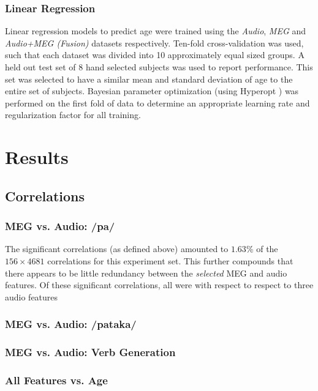 \documentclass[a4paper]{article}
\begin{document}
\subsubsection{Linear Regression}

Linear regression models to predict age were trained using the \textit{Audio}, \textit{MEG} and \textit{Audio+MEG (Fusion)} datasets respectively. Ten-fold cross-validation was used, such that each dataset was divided into 10 approximately equal sized groups. A held out test set of 8 hand selected subjects was used to report performance. This set was selected to have a similar mean and standard deviation of age to the entire set of subjects. Bayesian parameter optimization (using Hyperopt \cite{Bergstra2013}) was performed on the first fold of data to determine an appropriate learning rate and regularization factor for all training.

\section{Results}

\subsection{Correlations} 

\subsubsection{MEG vs. Audio: /pa/}

The significant correlations (as defined above) amounted to $1.63$\% of the $156 \times 4681$ correlations for this experiment set. This further compounds that there appears to be little redundancy between the \textit{selected} MEG and audio features. Of these significant correlations, all were with respect to respect to three audio features

\subsubsection{MEG vs. Audio: /pataka/}


\subsubsection{MEG vs. Audio: Verb Generation}


\subsubsection{All Features vs. Age}
\end{document}
